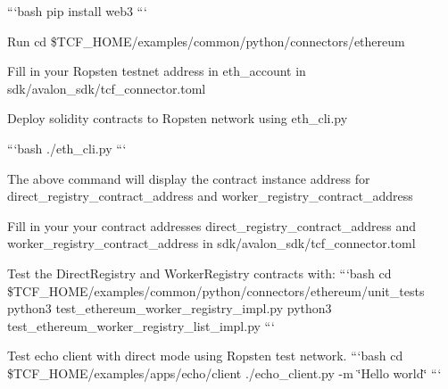 \begin{DoxyEnumerate}
```bash pip install web3 ```
\item Run {\ttfamily cd \$\+T\+C\+F\+\_\+\+H\+O\+ME/examples/common/python/connectors/ethereum}
\item Fill in your Ropsten testnet address in {\ttfamily eth\+\_\+account} in {\ttfamily sdk/avalon\+\_\+sdk/tcf\+\_\+connector.\+toml}
\item Deploy solidity contracts to Ropsten network using {\ttfamily eth\+\_\+cli.\+py}

```bash ./eth\+\_\+cli.py ```

The above command will display the contract instance address for {\ttfamily direct\+\_\+registry\+\_\+contract\+\_\+address} and {\ttfamily worker\+\_\+registry\+\_\+contract\+\_\+address}
\item Fill in your your contract addresses {\ttfamily direct\+\_\+registry\+\_\+contract\+\_\+address} and {\ttfamily worker\+\_\+registry\+\_\+contract\+\_\+address} in {\ttfamily sdk/avalon\+\_\+sdk/tcf\+\_\+connector.\+toml}
\item Test the Direct\+Registry and Worker\+Registry contracts with\+: ```bash cd \$\+T\+C\+F\+\_\+\+H\+O\+ME/examples/common/python/connectors/ethereum/unit\+\_\+tests python3 test\+\_\+ethereum\+\_\+worker\+\_\+registry\+\_\+impl.\+py python3 test\+\_\+ethereum\+\_\+worker\+\_\+registry\+\_\+list\+\_\+impl.\+py ```
\item Test echo client with direct mode using Ropsten test network. ```bash cd \$\+T\+C\+F\+\_\+\+H\+O\+ME/examples/apps/echo/client ./echo\+\_\+client.py -\/m \char`\"{}\+Hello world\char`\"{} ``` 
\end{DoxyEnumerate}